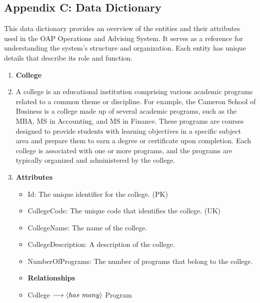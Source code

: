 \documentclass[12pt]{article}
\begin{document}
\begin{appendices}
\section{Appendix C: Data Dictionary}
This data dictionary provides an overview of the entities and their attributes used in the OAP Operations and Advising System. It serves as a reference for understanding the system's structure and organization. Each entity has unique details that describe its role and function.

\begin{enumerate}[label=(\roman*)]
    \newpage
    \item \textbf{College}
    \item[] A college is an educational institution comprising various academic programs related to a common theme or discipline. For example, the Cameron School of Business is a college made up of several academic programs, such as the MBA, MS in Accounting, and MS in Finance. These programs are courses designed to provide students with learning objectives in a specific subject area and prepare them to earn a degree or certificate upon completion. Each college is associated with one or more programs, and the programs are typically organized and administered by the college.
    \item[] \textbf{Attributes}
    \begin{itemize}
        \item Id: The unique identifier for the college. (PK)
        \item CollegeCode: The unique code that identifies the college. (UK)
        \item CollegeName: The name of the college.
        \item CollegeDescription: A description of the college.
        \item NumberOfPrograms: The number of programs that belong to the college.
    \end{itemize}
    \begin{itemize}
        \item \textbf{Relationships}
        \item College $ \longrightarrow \langle has \hspace{0.125cm} many \rangle $  Program
    \end{itemize}


\end{enumerate}
\end{appendices}
\end{document}
